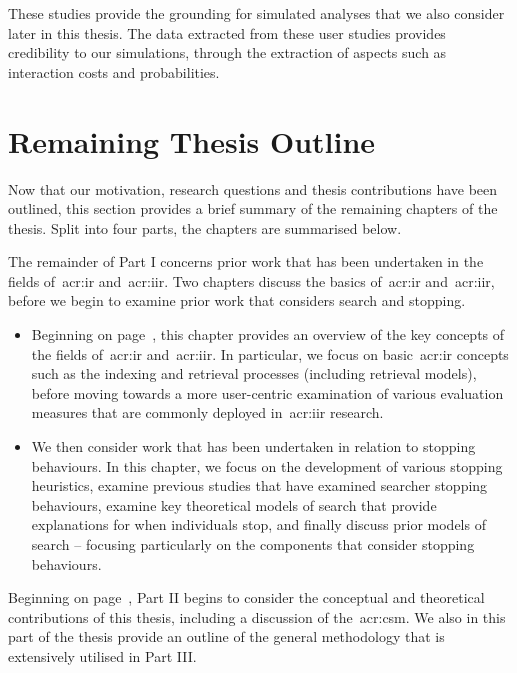 These studies provide the grounding for simulated analyses that we also consider later in this thesis. The data extracted from these user studies provides credibility to our simulations, through the extraction of aspects such as interaction costs and probabilities.

\section{Remaining Thesis Outline}
Now that our motivation, research questions and thesis contributions have been outlined, this section provides a brief summary of the remaining chapters of the thesis. Split into four parts, the chapters are summarised below.

\noindent
{}
The remainder of Part I concerns prior work that has been undertaken in the fields of~\gls{acr:ir} and~\gls{acr:iir}. Two chapters discuss the basics of~\gls{acr:ir} and~\gls{acr:iir}, before we begin to examine prior work that considers search and stopping.

\begin{itemize}
    \item[]{} Beginning on page~\pageref{chap:ir_background}, this chapter provides an overview of the key concepts of the fields of~\gls{acr:ir} and~\gls{acr:iir}. In particular, we focus on basic~\gls{acr:ir} concepts such as the indexing and retrieval processes (including retrieval models), before moving towards a more user-centric examination of various evaluation measures that are commonly deployed in~\gls{acr:iir} research.
    
    \item[]{} We then consider work that has been undertaken in relation to stopping behaviours. In this chapter, we focus on the development of various stopping heuristics, examine previous studies that have examined searcher stopping behaviours, examine key theoretical models of search that provide explanations for when individuals stop, and finally discuss prior models of search -- focusing particularly on the components that consider stopping behaviours. 
\end{itemize}

\noindent
{} Beginning on page~\pageref{part:stopping}, Part II begins to consider the conceptual and theoretical contributions of this thesis, including a discussion of the~\gls{acr:csm}. We also in this part of the thesis provide an outline of the general methodology that is extensively utilised in Part III.

